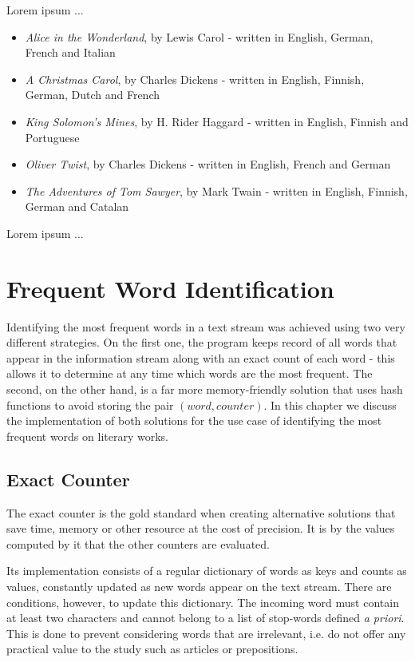 \documentclass[shortpaper]{revdetua}
\begin{document}
Lorem ipsum ...

\begin{itemize}
    \item \textit{Alice in the Wonderland}, by Lewis Carol - written in English, German, French and Italian
    \item \textit{A Christmas Carol}, by Charles Dickens - written in English, Finnish, German, Dutch and French
    \item \textit{King Solomon's Mines}, by H. Rider Haggard - written in English, Finnish and Portuguese
    \item \textit{Oliver Twist}, by Charles Dickens - written in English, French and German
    \item \textit{The Adventures of Tom Sawyer}, by Mark Twain - written in English, Finnish, German and Catalan
\end{itemize}

Lorem ipsum ...


\section{Frequent Word Identification}

Identifying the most frequent words in a text stream was achieved using two very different strategies.
On the first one, the program keeps record of all words that appear in the information stream along with an exact count of each word - this allows it to 
determine at any time which words are the most frequent.
The second, on the other hand, is a far more memory-friendly solution that uses hash functions to avoid storing the pair $(word, counter)$.
In this chapter we discuss the implementation of both solutions for the use case of identifying the most frequent words on literary works.

\subsection{Exact Counter}

The exact counter is the gold standard when creating alternative solutions that save time, memory or other resource at the cost of precision.
It is by the values computed by it that the other counters are evaluated.

Its implementation consists of a regular dictionary of words as keys and counts as values, constantly updated as new words appear on the text stream.
There are conditions, however, to update this dictionary.
The incoming word must contain at least two characters and cannot belong to a list of stop-words defined \textit{a priori}.
This is done to prevent considering words that are irrelevant, i.e. do not offer any practical value to the study such as articles or prepositions.
\end{document}
